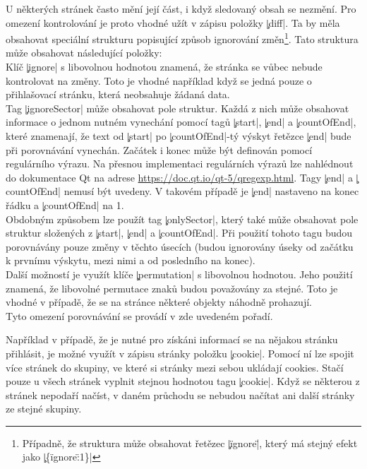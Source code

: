 U některých stránek často mění její část, i když sledovaný obsah se nezmění.
Pro omezení kontrolování je proto vhodné užít v zápisu položky \c|diff|.
Ta by měla obsahovat speciální strukturu  popisující způsob ignorování změn\footnote{Případně, že struktura může obsahovat řetězec \c|\"ignore\"|, který má stejný efekt jako \c|\{\"ignore\":1\}|}.
Tato struktura může obsahovat následující položky:\\
Klíč \c|ignore| s libovolnou hodnotou znamená, že stránka se vůbec nebude kontrolovat na změny.
Toto je vhodné například když se jedná pouze o přihlašovací stránku, která neobsahuje žádaná data.\\
Tag \c|ignoreSector| může obsahovat pole struktur.
Každá z nich může obsahovat informace o jednom nutném vynechání pomocí tagů \c|start|, \c|end| a \c|countOfEnd|,
které znamenají, že text od \c|start| po \c|countOfEnd|-tý výskyt řetězce \c|end| bude při porovnávání vynechán.
Začátek i konec může být definován pomocí regulárního výrazu.
Na přesnou implementaci regulárních výrazů lze nahlédnout do dokumentace Qt na adrese
\url{https://doc.qt.io/qt-5/qregexp.html}.
Tagy \c|end| a \c|countOfEnd| nemusí být uvedeny. V takovém případě je \c|end| nastaveno na konec řádku a \c|countOfEnd| na 1.
\\
Obdobným způsobem lze použít tag \c|onlySector|, který také může obsahovat pole struktur složených z \c|start|, \c|end| a \c|countOfEnd|.
Při použití tohoto tagu budou porovnávány pouze změny v těchto úsecích (budou ignorovány úseky od začátku k prvnímu výskytu, mezi nimi a od posledního na konec).
\\
Další možností je využít klíče \c|permutation| s libovolnou hodnotou.
Jeho použití znamená, že libovolné permutace znaků budou považovány za stejné.
Toto je vhodné v případě, že se na stránce některé objekty náhodně prohazují.
\\
Tyto omezení porovnávání se provádí v zde uvedeném pořadí.




Například v případě, že je nutné pro získáni informací se na nějakou stránku přihlásit, je možné využít v zápisu stránky položku \c|cookie|.
Pomocí ní lze spojit více stránek do skupiny, ve které si stránky mezi sebou ukládají cookies.
Stačí pouze u všech stránek vyplnit stejnou hodnotou tagu \c|cookie|.
Když se některou z stránek nepodaří načíst, v daném průchodu se nebudou načítat ani další stránky ze stejné skupiny.
